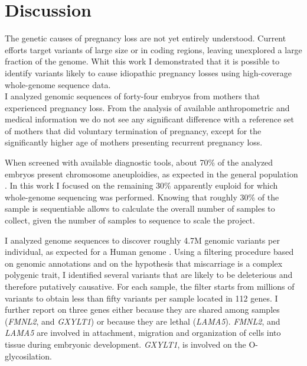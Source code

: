 
\chapter{Discussion} %

\label{Chapter4} %


\newcommand{\keyword}[1]{\textbf{#1}}
\newcommand{\tabhead}[1]{\textbf{#1}}
\newcommand{\code}[1]{\texttt{#1}}
\newcommand{\file}[1]{\texttt{\bfseries#1}}
\newcommand{\option}[1]{\texttt{\itshape#1}}



The genetic causes of pregnancy loss are not yet entirely understood. Current efforts target variants of large size or in coding regions, leaving unexplored a large fraction of the genome. Whit this work I demonstrated that it is possible to identify variants likely to cause idiopathic pregnancy losses using high-coverage whole-genome sequence data.\\ 

I analyzed genomic sequences of forty-four embryos from mothers that experienced pregnancy loss. From the analysis of available anthropometric and medical information we do not see any significant difference with a reference set of mothers that did voluntary termination of pregnancy, except for the significantly higher age of mothers presenting recurrent pregnancy loss. 

When screened with available diagnostic tools, about 70\% of the analyzed embryos present chromosome aneuploidies, as expected in the general population \cite{goddijn2000genetic,zhang2009genetic}. In this work I focused on the remaining 30\% apparently euploid for which whole-genome sequencing was performed. Knowing that roughly 30\% of the sample is sequentiable allows to calculate the overall number of samples to collect, given the number of samples to sequence to scale the project.   

I analyzed genome sequences to discover roughly 4.7M genomic variants per individual, as expected for a Human genome \cite{1000genome2015global}. Using a filtering procedure  based on genomic annotations and on the hypothesis that miscarriage is a complex polygenic trait, I identified several variants that are likely to be deleterious and therefore putatively causative. For each sample, the filter starts from millions of variants to obtain less than fifty variants per sample located in 112 genes. I further report on three genes either because they are shared among samples (\textit{FMNL2}, and \textit{GXYLT1}) or because they are lethal (\textit{LAMA5}). \textit{FMNL2}, and \textit{LAMA5} are involved in attachment, migration and organization of cells into tissue during embryonic development. \textit{GXYLT1}, is involved on the O-glycosilation.\\

